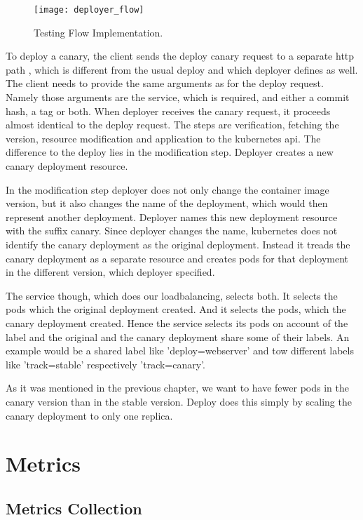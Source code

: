 \begin{figure}[htbp] \centering \texttt{[image: deployer\_flow]}
  \caption[nprtflow]{Testing Flow Implementation.}
  \label{fig:testing_flow}
\end{figure}


To deploy a canary, the client sends the deploy canary request to a separate http path ,
which is different from the usual deploy and which deployer defines as well. The client
needs to provide the same arguments as for the deploy request. Namely those arguments are
the service, which is required, and either a commit hash, a tag or both. When deployer
receives the canary request, it proceeds almost identical to the deploy request. The steps
are verification, fetching the version, resource modification and application to the
kubernetes api. The difference to the deploy lies in the modification step. Deployer
creates a new canary deployment resource.

In the modification step deployer does not only change the container image version, but it
also changes the name of the deployment, which would then represent another
deployment. Deployer names this new deployment resource with the suffix canary. Since
deployer changes the name, kubernetes does not identify the canary deployment as the
original deployment. Instead it treads the canary deployment as a separate resource and
creates pods for that deployment in the different version, which deployer specified.

The service though, which does our loadbalancing, selects both. It selects the pods which
the original deployment created. And it selects the pods, which the canary deployment
created. Hence the service selects its pods on account of the label and the original and
the canary deployment share some of their labels. An example would be a shared label like
'deploy=webserver' and tow different labels like 'track=stable' respectively
'track=canary'.

As it was mentioned in the previous chapter, we want to have fewer pods in the canary
version than in the stable version. Deploy does this simply by scaling the canary
deployment to only one replica.

\section{Metrics}

\subsection{Metrics Collection}

